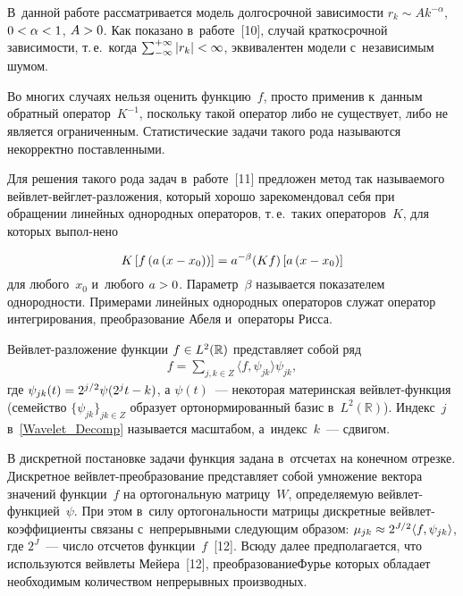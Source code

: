 \begin{multicols}{2}
В~данной работе рассматривается модель долгосрочной зависимости 
$r_k \sim Ak^{-\alpha}$, $0\hm < \alpha \hm<1$, $A\hm>0$. Как показано в~работе~[10], 
случай краткосрочной зависимости, т.\,е.\ когда $\sum\nolimits_{-\infty}^{+\infty} 
|r_k| \hm< \infty$, эквивалентен модели с~независимым шумом.

 Во многих случаях нельзя оценить функцию~$f$, просто применив к~данным обратный 
 оператор~$K^{-1}$, поскольку такой оператор либо не существует, либо не 
 является ограниченным. Статистические задачи такого рода называются \mbox{некорректно} 
 поставленными. 
 
 Для решения такого рода задач в~работе~[11] предложен метод так 
 называемого вейв\-лет-вейг\-лет-раз\-ло\-же\-ния, 
 который хорошо зарекомендовал себя при обращении линейных однородных операторов, т.\,е.\
  таких операторов~$K$, для которых выпол-\linebreak нено
  
 
  
  \noindent
\begin{equation}
K\left[f\left(a\left(x-x_0\right)\right)\right]=a^{-\beta}(Kf)\left[a\left(x-x_0\right)\right]\notag
\end{equation}
для любого~$x_0$ и~любого $a\hm>0$. Параметр~$\beta$ называется 
показателем однородности. Примерами линейных однородных операторов служат 
оператор интегрирования, преобразование Абеля и~операторы Рисса.

 Вейвлет-разложение функции $f\hm\in L^2(\mathbb{R})$ представляет собой ряд
\begin{align}
f=\sum\limits_{j,k\in Z}\langle f,\psi_{jk}\rangle\psi_{jk},
\label{Wavelet_Decomp}
\end{align}
где $\psi_{jk}(t)\hm=2^{j/2}\psi(2^jt-k)$, а $\psi(t)$~--- 
некоторая материнская вейв\-лет-функ\-ция (семейство $\{\psi_{jk}\}_{jk\in Z}$ 
образует ортонормированный базис в~$L^2(\mathbb{R})$). Индекс~$j$ 
в~\eqref{Wavelet_Decomp} называется масштабом, а~индекс~$k$~--- сдвигом.

В дискретной постановке задачи функция задана в~отсчетах на конечном отрезке. 
Дискретное вейв\-лет-пре\-обра\-зо\-ва\-ние представляет собой умножение вектора 
значений функции~$f$ на орто\-гональную матрицу~$W$, определяемую вейв\-лет-функ\-цией~$\psi$. 
При этом в~силу ортогональности матри\-цы дискретные вейв\-лет-ко\-эф\-фи\-ци\-ен\-ты 
\mbox{связаны} с~непрерывными следующим образом: 
$\mu_{jk}\hm\approx 2^{J/2}\langle f,\psi_{jk}\rangle$, где $2^J$~--- 
число отсчетов функции~$f$~[12]. Всюду далее предполагается, что используются 
вейвлеты Мейера~[12], преобразование\linebreak \mbox{Фурье} которых обладает необходимым количеством 
непрерывных производных.


\end{multicols}
